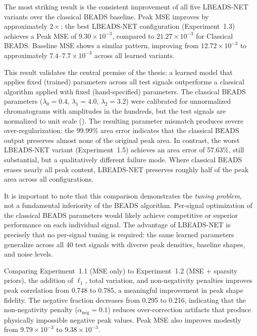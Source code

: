 The most striking result is the consistent improvement of all five LBEADS-NET variants over the classical BEADS baseline. Peak MSE improves by approximately $2\times$: the best LBEADS-NET configuration (Experiment~1.3) achieves a Peak MSE of $9.30 \times 10^{-3}$, compared to $21.27 \times 10^{-3}$ for Classical BEADS. Baseline MSE shows a similar pattern, improving from $12.72 \times 10^{-3}$ to approximately $7.4$--$7.7 \times 10^{-3}$ across all learned variants.

This result validates the central premise of the thesis: a learned model that applies fixed (trained) parameters across all test signals outperforms a classical algorithm applied with fixed (hand-specified) parameters. The classical BEADS parameters ($\lambda_0 = 0.4$, $\lambda_1 = 4.0$, $\lambda_2 = 3.2$) were calibrated for unnormalized chromatograms with amplitudes in the hundreds, but the test signals are normalized to unit scale (). The resulting parameter mismatch produces severe over-regularization: the 99.99\% area error indicates that the classical BEADS output preserves almost none of the original peak area. In contrast, the worst LBEADS-NET variant (Experiment~1.5) achieves an area error of 57.63\%, still substantial, but a qualitatively different failure mode. Where classical BEADS erases nearly all peak content, LBEADS-NET preserves roughly half of the peak area across all configurations.

It is important to note that this comparison demonstrates the \emph{tuning problem}, not a fundamental inferiority of the BEADS algorithm. Per-signal optimization of the classical BEADS parameters would likely achieve competitive or superior performance on each individual signal. The advantage of LBEADS-NET is precisely that no per-signal tuning is required: the same learned parameters generalize across all 40 test signals with diverse peak densities, baseline shapes, and noise levels.


Comparing Experiment~1.1 (MSE only) to Experiment~1.2 (MSE + sparsity priors), the addition of $\ell_1$, total variation, and non-negativity penalties improves peak correlation from 0.748 to 0.785, a meaningful improvement in peak shape fidelity. The negative fraction decreases from 0.295 to 0.216, indicating that the non-negativity penalty ($\alpha_{\text{neg}} = 0.1$) reduces over-correction artifacts that produce physically impossible negative peak values. Peak MSE also improves modestly from $9.79 \times 10^{-3}$ to $9.38 \times 10^{-3}$.

